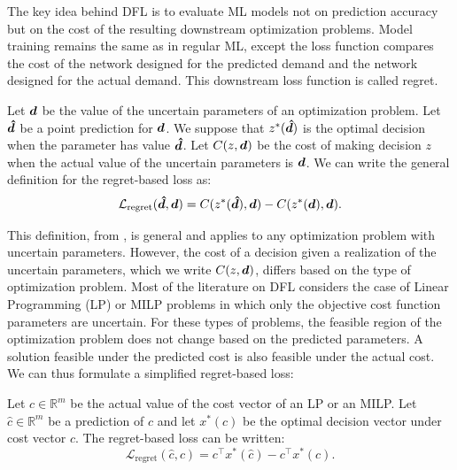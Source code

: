The key idea behind DFL is to evaluate ML models not on prediction accuracy but on the cost of the resulting downstream optimization problems. Model training remains the same as in regular ML, except the loss function compares the cost of the network designed for the predicted demand and the network designed for the actual demand. This downstream loss function is called regret. 

\begin{defin}
    \label{defin:litrev:regret}
    Let ${\bm{d}}$ be the value of the uncertain parameters of an optimization problem. Let ${\bm{\hat{d}}}$ be a point prediction for ${\bm{d}}$. We suppose that $z^*({\bm{\hat{d}}})$ is the optimal decision when the parameter has value ${\bm{\hat{d}}}$. Let $C(z, {\bm{d}})$ be the cost of making decision $z$ when the actual value of the uncertain parameters is ${\bm{d}}$. We can write the general definition for the regret-based loss as: 
    $$\mathcal{L}_{\text{regret}}({\bm{\hat{d}}}, {\bm{d}}) = C(z^*({\bm{\hat{d}}}), {\bm{d}}) - C(z^*({\bm{d}}), {\bm{d}}).$$
\end{defin}

This definition, from \cite{sadanaSurveyContextualOptimization2023}, is general and applies to any optimization problem with uncertain parameters. However, the cost of a decision given a realization of the uncertain parameters, which we write $C(z, {\bm{d}})$, differs based on the type of optimization problem. Most of the literature on DFL considers the case of Linear Programming (LP) or MILP problems in which only the objective cost function parameters are uncertain. For these types of problems, the feasible region of the optimization problem does not change based on the predicted parameters. A solution feasible under the predicted cost is also feasible under the actual cost. We can thus formulate a simplified regret-based loss:

\begin{defin}
\label{defin:litrev:simple-regret}
Let $c \in \mathbb{R}^m$ be the actual value of the cost vector of an LP or an MILP. Let $\hat{c} \in \mathbb{R}^m$ be a prediction of $c$ and let $x^*(c)$ be the optimal decision vector under cost vector $c$. The regret-based loss can be written:
\begin{equation*}
    \mathcal{L}_{\text{regret}}(\hat{c}, c) = c^\top x^*(\hat{c}) - c^\top x^*(c).
\end{equation*}
\end{defin}

